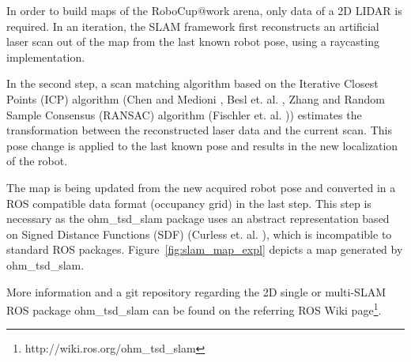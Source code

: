In order to build maps of the RoboCup$@$work arena, only data of a 2D LIDAR is required. In an iteration, the SLAM framework first reconstructs an artificial laser scan out of the map from the last known robot pose, using a raycasting implementation. 

In the second step, a scan matching algorithm based on the Iterative Closest Points (ICP) algorithm (Chen and Medioni \cite{chen:icp}, Besl et. al. \cite{bsl:icp}, Zhang \cite{zhang:icp} and Random Sample Consensus (RANSAC) algorithm (Fischler et. al. \cite{Fischler:ransac})) estimates the transformation between the reconstructed laser data and the current scan. This pose change is applied to the last known pose and results in the new localization of the robot. 

The map is being updated from the new acquired robot pose and converted in a ROS compatible data format (occupancy grid) in the last step. This step is necessary as the ohm\_tsd\_slam package uses an abstract representation based on Signed Distance Functions (SDF) (Curless et. al. \cite{curless:sdf}), which is incompatible to standard ROS packages. Figure~\ref{fig:slam_map_expl} depicts a map generated by ohm\_tsd\_slam.

More information and a git repository regarding the 2D single or multi-SLAM ROS package ohm\_tsd\_slam can be found on the referring ROS Wiki page\footnote{http://wiki.ros.org/ohm\_tsd\_slam}.


